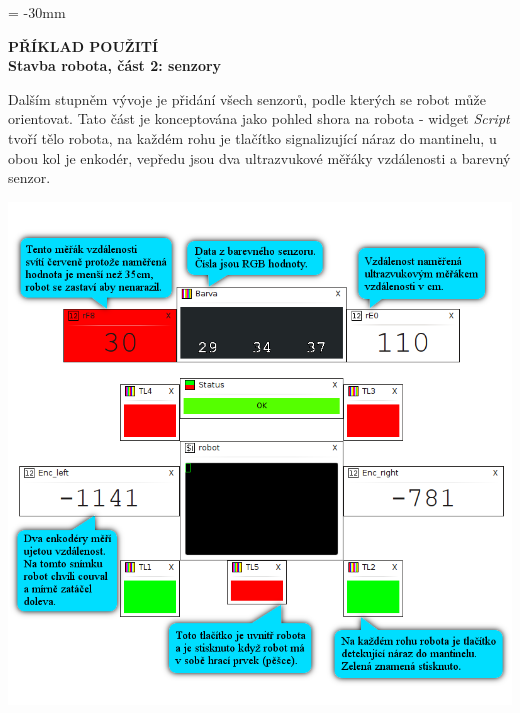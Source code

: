 \documentclass[12pt, a4paper, oneside]{article}
\newcommand{\B}{\textbf} %
\newcommand{\It}{\textit}  %
\begin{document}
\newpage
\voffset = -30mm %
\begin{center}
    \Large \B{PŘÍKLAD POUŽITÍ \\ Stavba robota, část 2: senzory}
\end{center}
\vspace{5mm}
Dalším stupněm vývoje je přidání všech senzorů, podle kterých se robot může orientovat. Tato část je konceptována jako pohled shora na robota - widget \It{Script} tvoří tělo robota, na každém rohu je tlačítko signalizující náraz do mantinelu, u obou kol je enkodér, vepředu jsou dva ultrazvukové měřáky vzdálenosti a barevný senzor.
\begin{center}
\includegraphics[scale=0.85]{img/sensors2.png}
\end{center}
\end{document}
